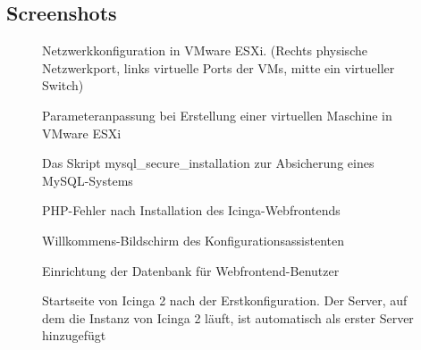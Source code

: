 \subsection{Screenshots}
\label{Screenshots}

\begin{figure}[htb]
\centering
{}
\caption{Netzwerkkonfiguration in VMware ESXi. (Rechts physische Netzwerkport, links virtuelle Ports der VMs, mitte ein virtueller Switch)}
\label{screen:vmnetwork}
\end{figure}

\begin{figure}[htb]
\centering
{}
\caption{Parameteranpassung bei Erstellung einer virtuellen Maschine in VMware ESXi}
\label{screen:vmcreation}
\end{figure}
\clearpage

\begin{figure}[!htb]
\centering
{}
\caption{Das Skript \glqq{}mysql\_{}secure\_{}installation\grqq{} zur Absicherung eines MySQL-Systems}
\label{screen:mysqlsecure}
\end{figure}

\begin{figure}[!htb]
\centering
{}
\caption{PHP-Fehler nach Installation des Icinga-Webfrontends}
\label{screen:phperror}
\end{figure}

\begin{figure}[!htb]
\centering
{}
\caption{Willkommens-Bildschirm des Konfigurationsassistenten}
\label{screen:konfigassistent}
\end{figure}

\begin{figure}[!htb]
\centering
{}
\caption{Einrichtung der Datenbank für Webfrontend-Benutzer}
\label{screen:userdb}
\end{figure}

\begin{figure}[!htb]
\centering
{}
\caption{Startseite von \glqq{}Icinga 2\grqq{} nach der Erstkonfiguration. Der Server, auf dem die Instanz von \glqq{}Icinga 2\grqq{} läuft, ist automatisch als erster Server hinzugefügt}
\label{screen:landingpage}
\end{figure}

